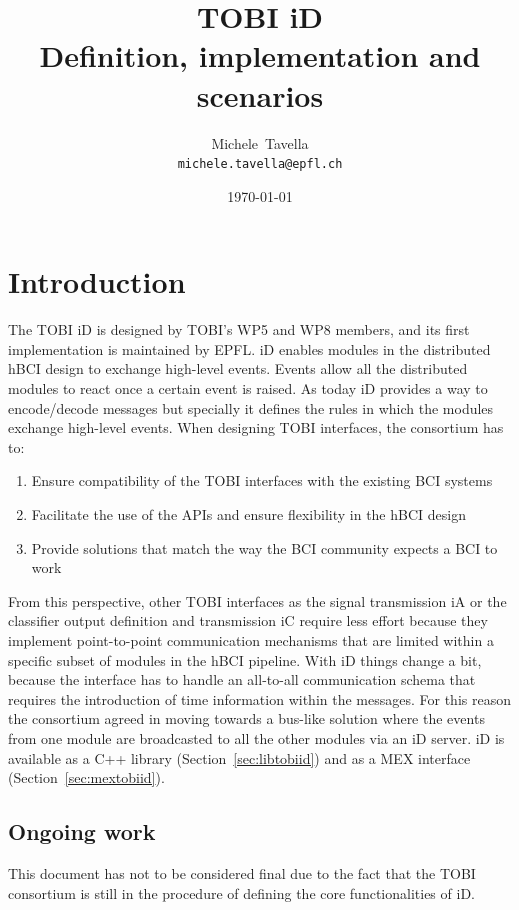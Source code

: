 \documentclass[a4paper,10pt]{article}
\title{TOBI iD\\
\large{Definition, implementation and scenarios}}
\author{Michele~Tavella\\
\footnotesize{\texttt{michele.tavella@epfl.ch}}}
\begin{document}
\date{\today}
\maketitle
\tableofcontents 
\pagebreak

\section{Introduction}
\label{sec:introduction}
The TOBI iD is designed by TOBI’s WP5 and WP8 members, and its first
implementation is maintained by EPFL.
iD enables modules in the distributed hBCI design to exchange high-level
events.
Events allow all the distributed modules to react once a certain event is
raised. 
As today iD provides a way to encode/decode messages but specially it defines
the rules in which the modules exchange high-level events.
When designing TOBI interfaces, the consortium has to: 
\begin{enumerate}
  \item Ensure compatibility of the TOBI interfaces with the existing BCI
  systems
  \item Facilitate the use of the APIs and ensure flexibility in the hBCI design
  \item Provide solutions that match the way the BCI community expects a BCI to
  work
\end{enumerate}
From this perspective, other TOBI interfaces as the signal transmission iA or
the classifier output definition and transmission iC require less effort because
they implement point-to-point communication mechanisms that are limited within a
specific subset of modules in the hBCI pipeline.
With iD things change a bit, because the interface has to handle an all-to-all
communication schema that requires the introduction of time information within
the messages.
For this reason the consortium agreed in moving towards a bus-like solution
where the events from one module are broadcasted to all the other modules via an
iD server.
iD is available as a C++ library (Section~\ref{sec:libtobiid}) and as a MEX
interface (Section~\ref{sec:mextobiid}).

\subsection*{Ongoing work}
This document has not to be considered final due to the fact that the TOBI
consortium is still in the procedure of defining the core functionalities of iD.
\end{document}
